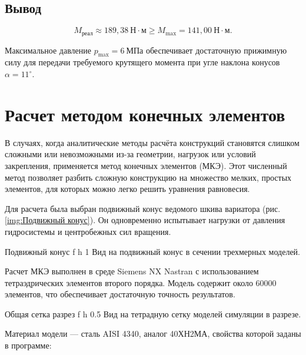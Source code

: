 \section*{Вывод}

\[
M_{\text{реал}} \approx 189{,}38\ \text{Н}\cdot\text{м}
\ge
M_{\max}=141{,}00\ \text{Н}\cdot\text{м}.
\]

Максимальное давление $p_{\max}=6\ \text{МПа}$ обеспечивает достаточную прижимную силу для передачи требуемого крутящего момента при угле наклона конусов $\alpha=11^\circ$.

\chapter{Расчет методом конечных элементов}

В случаях, когда аналитические методы расчёта конструкций становятся слишком сложными или невозможными из-за геометрии, нагрузок или условий закрепления, применяется метод конечных элементов (МКЭ). Этот численный метод позволяет разбить сложную конструкцию на множество мелких, простых элементов, для которых можно легко решить уравнения равновесия.

Для расчета была выбран подвижный конус ведомого шкива вариатора (рис. \ref{img:Подвижный конус}). Он одновременно испытывает нагрузки от давления гидросистемы и центробежных сил вращения. 

    {Подвижный конус} %
    {f} %
    {h} %
    {1\textwidth} %
    {Вид на подвижный конус в сечении трехмерных моделей.} %

\newpage

Расчет МКЭ выполнен в среде Siemens NX Nastran с использованием тетраэдрических элементов второго порядка. Модель содержит около 60000 элементов, что обеспечивает достаточную точность результатов.

    {Общая сетка разрез} %
    {f} %
    {h} %
    {0.5\textwidth} %
    {Вид на тетрадную сетку моделей симуляции в разрезе.} %

Материал модели — сталь AISI 4340, аналог 40ХН2МА, свойства которой заданы в программе:

